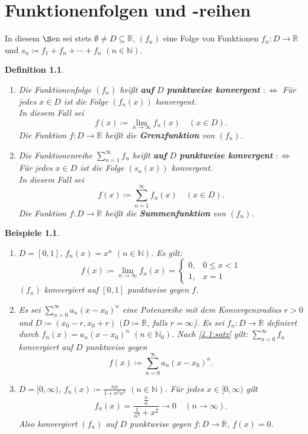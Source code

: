 \documentclass[12pt]{extreport} %
\newcommand{\N}{\mathbb{N}}
\newcommand{\R}{\mathbb{R}}
\theoremstyle{named}
\theoremstyle{itshape}
\newtheorem*{definition}{Definition}
\theoremstyle{normal}
\newtheorem*{beispiele}{Beispiele}
\begin{document}
{\newpage

\chapter{Funktionenfolgen und -reihen}
In diesem $\S$en sei stets $\emptyset \neq D \subseteq \R$, $(f_{n})$ eine Folge von Funktionen $f_{n} \colon D \rightarrow \R$ und $s_{n} \coloneqq f_{1} + f_{n} + \cdots + f_{n}$ $(n \in \N)$.

  
\begin{definition} ~\
 	\begin{enumerate}
		\item Die Funktionenfolge $(f_{n})$ hei{\ss}t \textbf{auf} $D$ \textbf{punktweise konvergent} $:\iff$ Für jedes $x \in D$ ist die Folge $(f_{n}(x))$ konvergent. \\
			In diesem Fall sei
			$$f(x) \coloneqq \lim_{n \to \infty} f_{n}(x) \quad (x \in D).$$ 
			Die Funktion $f \colon D \rightarrow \R$ hei{\ss}t die \textbf{Grenzfunktion} von $(f_{n})$.
		\item Die Funktionenreihe $\sum_{n=1}^{\infty} f_{n}$ hei{\ss}t \textbf{auf} $D$ \textbf{punktweise konvergent} $:\iff$ Für jedes $x \in D$ ist die Folge $(s_{n}(x))$ konvergent. \\
			In diesem Fall sei 
			$$
			f(x) \coloneqq \sum_{n=1}^{\infty} f_{n}(x) \quad (x \in D).
			$$
			Die Funktion $f \colon D \rightarrow \R$ hei{\ss}t die \textbf{Summenfunktion} von $(f_{n})$.
	\end{enumerate}
\end{definition}


\begin{beispiele} ~\
	\begin{enumerate}
		\item $D = [0,1]$, $f_{n}(x) = x^{n}$ $(n \in \N)$. Es gilt:
			$$ f(x) \coloneqq \lim_{n\rightarrow\infty} f_{n}(x) = \begin{cases} 0, & 0 \leq x < 1 \\  1, & x = 1 \end{cases} $$
			$(f_{n})$ konvergiert auf $[0, 1]$ punktweise gegen $f$.
		\item Es sei $\sum_{n=0}^{\infty} a_{n} (x-x_{0})^{n}$ eine Potenzreihe mit dem Konvergenzradius $r > 0$ und $D \coloneqq (x_{0} - r, x_{0} + r)$ 
		$(D \coloneqq \R$, falls $r = \infty$). Es sei $f_n:D \to \R$ definiert durch $f_{n}(x) = a_{n} (x - x_{0})^{n}$ $(n \in \N_0)$. Nach \ref{4.1:satz} gilt:
		$\sum_{n=0}^{\infty} f_{n}$ konvergiert auf $D$ punktweise gegen $$f(x) \coloneqq \sum_{n=0}^{\infty} a_{n} (x-x_{0})^{n}.$$
		\item $D = [0, \infty)$, $f_{n}(x) \coloneqq \frac{nx}{1+n^{2}x^{2}}$ $(n \in \N)$. Für jedes $x \in [0,\infty)$ gilt
		$$
		f_n(x) = \frac{\frac{x}{n}}{\frac{1}{n^2} + x^{2}} \rightarrow 0 \quad (n \rightarrow \infty).
		$$
		Also konvergiert $(f_{n})$ auf $D$ punktweise gegen $f:D \to \R$, $f(x)=0$. 
	\end{enumerate}
\end{beispiele}

}
\end{document}
